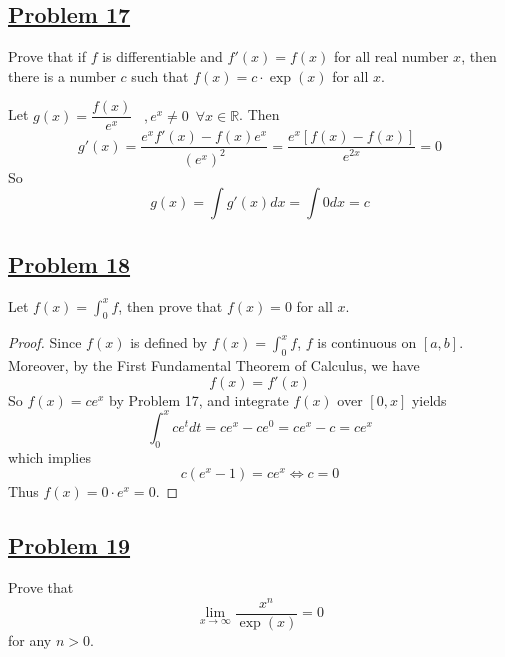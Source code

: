 \documentclass[10pt,letterpaper]{article}
\begin{document}
	\subsection*{{\color{purple}\underline{Problem 17}}}
	Prove that if $f$ is differentiable and $f'(x) = f(x)$ for all real number $x$, then 
	there is a number $c$ such that $f(x) = c \cdot \exp(x)$ for all $x$.
	
	Let $g(x) = \dfrac{f(x)}{e^x} \,\,\,\,\, ,e^x \neq 0 \,\,\, \forall x \in \mathbb{R}$. 
	Then
	$$g'(x) = \dfrac{e^xf'(x) - f(x)e^x}{(e^x)^2} = 
	\dfrac{e^x[f(x) - f(x)]}{e^{2x}} = 	
	0$$
	So 
	$$g(x) = \int g'(x)dx = \int 0 dx = c $$	
	
	\subsection*{{\color{purple}\underline{Problem 18}}}
	Let $f(x) = \displaystyle\int_0^x f$, then prove that $f(x) = 0$ for all $x$.
\begin{proof}
	Since $f(x)$ is defined by $f(x) = \displaystyle\int_0^x f$, $f$ is continuous on $[a, b]$.
	Moreover, by the First Fundamental Theorem of Calculus, we have 
	$$f(x) = f'(x)$$
	So $f(x) = ce^{x}$ by Problem 17, and integrate $f(x)$ over $[0, x]$ yields
	$$\int_0^x ce^{t}dt = ce^{x} - ce^0 = ce^{x} - c = ce^{x}$$
	which implies
	$$c(e^x - 1) = ce^x \Leftrightarrow c = 0$$
	Thus $f(x) = 0 \cdot e^x = 0$.
\end{proof}
	
	\subsection*{{\color{purple}\underline{Problem 19}}}
	Prove that
	$$\displaystyle\lim_{x\to \infty} \dfrac{x^n}{\exp(x)} = 0$$
	for any $n > 0$.
	
\end{document}
